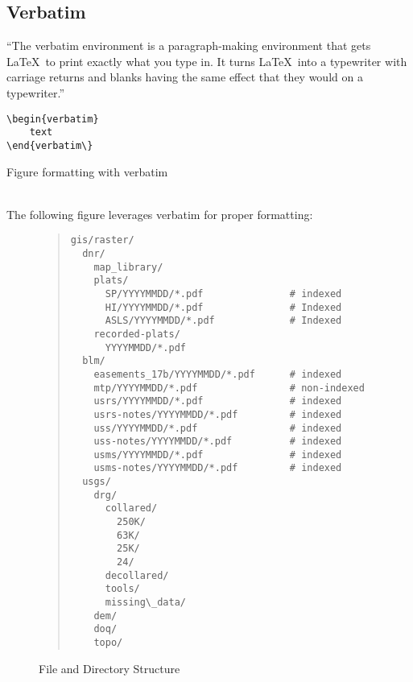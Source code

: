 \documentclass[12pt,letterpaper,dvips]{article}
\begin{document}
\clearpage
\newpage
\subsection{Verbatim}

``The verbatim environment is a paragraph-making environment that gets
\LaTeX\ to print exactly what you type in. It turns \LaTeX\ into a typewriter
with carriage returns and blanks having the same effect that they would
on a typewriter.''\footnotemark

\begin{verbatim}
\begin{verbatim}
    text
\end{verbatim\}
\end{verbatim}


\noindent\begin{bf}Figure formatting with verbatim\end{bf}\\
\noindent The following figure leverages verbatim for proper formatting:
\vspace{-5mm}
\begin{center}
\begin{figure}[htb]
\begin{quote}
\small
\begin{Verbatim}[frame=none]
gis/raster/
  dnr/
    map_library/
    plats/
      SP/YYYYMMDD/*.pdf               # indexed
      HI/YYYYMMDD/*.pdf               # Indexed
      ASLS/YYYYMMDD/*.pdf             # Indexed
    recorded-plats/
      YYYYMMDD/*.pdf
  blm/
    easements_17b/YYYYMMDD/*.pdf      # indexed
    mtp/YYYYMMDD/*.pdf                # non-indexed
    usrs/YYYYMMDD/*.pdf               # indexed
    usrs-notes/YYYYMMDD/*.pdf         # indexed
    uss/YYYYMMDD/*.pdf                # indexed
    uss-notes/YYYYMMDD/*.pdf          # indexed
    usms/YYYYMMDD/*.pdf               # indexed
    usms-notes/YYYYMMDD/*.pdf         # indexed
  usgs/
    drg/
      collared/ 
        250K/
        63K/
        25K/
        24/
      decollared/
      tools/
      missing\_data/
    dem/
    doq/
    topo/
\end{Verbatim}
\normalsize
\end{quote}
\caption{File and Directory Structure}
\label{fig:dirlayout}
\end{figure}
\end{center}
\end{document}
